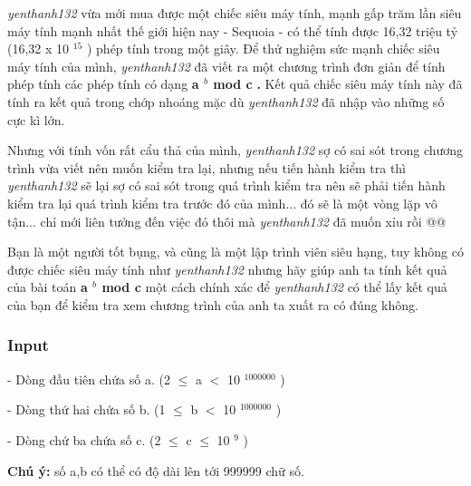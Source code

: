 



\emph{      yenthanh132     }     vừa mới mua được một chiếc siêu máy tính, mạnh gấp trăm lần siêu máy tính mạnh nhất thế giới hiện nay - Sequoia - có thể tính được 16,32 triệu tỷ (16,32 x 10    $^      15     $     ) phép tính trong một giây. Để thử nghiệm sức mạnh chiếc siêu máy tính của mình,    \emph{      yenthanh132     }     đã viết ra một chương trình đơn giản để tính phép tính các phép tính có dạng    \textbf{      a     $^       b      $      mod c     }\textbf{      .     }\textbf{}     Kết quả chiếc siêu máy tính này đã tính ra kết quả trong chớp nhoáng mặc dù    \emph{      yenthanh132     }     đã nhập vào những số cực kì lớn.    



     Nhưng với tính vốn rất cẩu thả của mình,    \emph{      yenthanh132     }     sợ có sai sót trong chương trình vừa viết nên muốn kiểm tra lại, nhưng nếu tiến hành kiểm tra thì    \emph{      yenthanh132     }     sẽ lại sợ có sai sót trong quá trình kiểm tra nên sẽ phải tiến hành kiểm tra lại quá trình kiểm tra trước đó của mình... đó sẽ là một vòng lặp vô tận... chỉ mới liên tưởng đến việc đó thôi mà    \emph{      yenthanh132     }     đã muốn xỉu rồi @@    



     Bạn là một người tốt bụng, và cũng là một lập trình viên siêu hạng, tuy không có được chiếc siêu máy tính như    \emph{      yenthanh132     }     nhưng hãy giúp anh ta tính kết quả của bài toán    \textbf{      a     $^       b      $      mod c     }     một cách chính xác để    \emph{      yenthanh132     }     có thể lấy kết quả của bạn để kiểm tra xem chương trình của anh ta xuất ra có đúng không.    

\subsubsection{   Input  }

    - Dòng đầu tiên chứa số a. (2  $\le$  a $<$ 10   $^     1000000    $    )   



    - Dòng thứ hai chứa số b. (1  $\le$  b $<$ 10   $^     1000000    $    )   



    - Dòng chứ ba chứa số c. (2 $\le$ c $\le$ 10   $^     9    $    )   



\textbf{     Chú ý:    }    số a,b có thể có độ dài lên tới 999999 chữ số.   

